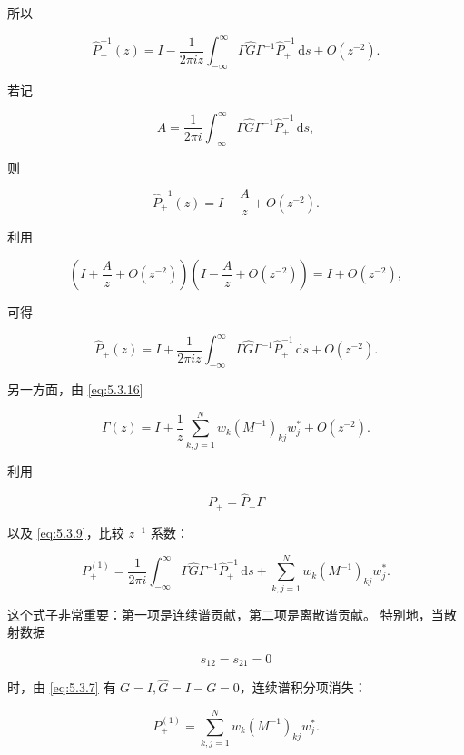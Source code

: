 \documentclass[
    lang=cn,
    scheme=chinese,
    mode=simple,
    device=normal,
    color=blue,
    math=cm,
    thmcnt=section,
    12pt
]{elegantbook}
\begin{document}
所以

\[
    \widehat P_+^{-1}(z)
    =
    I-
    \dfrac{1}{2\pi iz}
    \int_{-\infty}^{\infty}
    \Gamma\widehat G\Gamma^{-1}\widehat P_+^{-1}
    \,\mathrm ds
    +O(z^{-2}).
\]

若记

\[
    A=
    \dfrac{1}{2\pi i}
    \int_{-\infty}^{\infty}
    \Gamma\widehat G\Gamma^{-1}\widehat P_+^{-1}
    \,\mathrm ds,
\]

则

\[
    \widehat P_+^{-1}(z)=I-\dfrac{A}{z}+O(z^{-2}).
\]

利用

\[
    \left(I+\dfrac{A}{z}+O(z^{-2})\right)
    \left(I-\dfrac{A}{z}+O(z^{-2})\right)
    =I+O(z^{-2}),
\]

可得

\begin{equation}
    \widehat P_+(z)
    =
    I+
    \dfrac{1}{2\pi iz}
    \int_{-\infty}^{\infty}
    \Gamma\widehat G\Gamma^{-1}\widehat P_+^{-1}\,\mathrm ds
    +
    O(z^{-2}).
    \tag{5.4.7}
    \label{eq:5.4.7}
\end{equation}

另一方面，由 \eqref{eq:5.3.16}

\begin{equation}
    \Gamma(z)
    =
    I+
    \dfrac{1}{z}
    \sum\limits_{k,j=1}^{N}
    w_k(M^{-1})_{kj}w_j^*
    +
    O(z^{-2}).
    \tag{5.4.8}
    \label{eq:5.4.8}
\end{equation}

利用

\[
    P_+=\widehat P_+\Gamma
\]

以及 \eqref{eq:5.3.9}，比较 $z^{-1}$ 系数：

\begin{equation}
    P_+^{(1)}
    =
    \dfrac{1}{2\pi i}
    \int_{-\infty}^{\infty}
    \Gamma\widehat G\Gamma^{-1}\widehat P_+^{-1}\,\mathrm ds
    +
    \sum\limits_{k,j=1}^{N}
    w_k(M^{-1})_{kj}w_j^*.
    \tag{5.4.9}
    \label{eq:5.4.9}
\end{equation}

这个式子非常重要：第一项是连续谱贡献，第二项是离散谱贡献。
特别地，当散射数据

\[
    s_{12}=s_{21}=0
\]

时，由 \eqref{eq:5.3.7} 有 $G=I,\widehat G=I-G=0$，连续谱积分项消失：

\[
    P_+^{(1)}
    =
    \sum\limits_{k,j=1}^{N}
    w_k(M^{-1})_{kj}w_j^*.
\]
\end{document}
